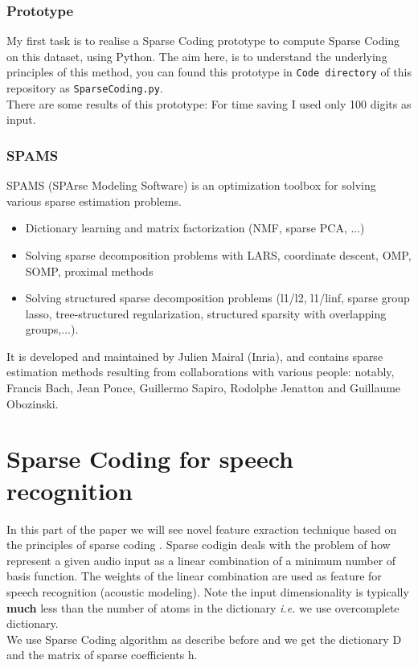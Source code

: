 \documentclass[a4paper,10pt]{article}
\begin{document}
\subsubsection{Prototype}
My first task is to realise a Sparse Coding prototype to compute Sparse Coding on this dataset, using Python. The aim here, is to understand the underlying principles of this method, you can found this prototype in \texttt{Code directory} of this repository as \texttt{SparseCoding.py}. \\
There are some results of this prototype: For time saving I used only 100 digits as input.

\subsubsection{SPAMS}
SPAMS (SPArse Modeling Software) is an optimization toolbox for solving various sparse estimation problems.
\begin{itemize}
 \item Dictionary learning and matrix factorization (NMF, sparse PCA, ...)
 \item Solving sparse decomposition problems with LARS, coordinate descent, OMP, SOMP, proximal methods
 \item Solving structured sparse decomposition problems (l1/l2, l1/linf, sparse group lasso, tree-structured regularization, structured sparsity with overlapping groups,...).
\end{itemize}
It is developed and maintained by Julien Mairal (Inria), and contains sparse estimation methods resulting from collaborations with various people: notably, Francis Bach, Jean Ponce, Guillermo Sapiro, Rodolphe Jenatton and Guillaume Obozinski.\\

\section{Sparse Coding for speech recognition}
In this part of the paper we will see novel feature exraction technique based on the principles of sparse coding \cite{DL_speech_reco}. Sparse codigin deals with the problem of how represent a given audio input as a linear combination of a minimum number of basis function. The weights of the linear combination are used as feature for speech recognition (acoustic modeling). Note the input dimensionality is typically \textbf{much} less than the number of atoms in the dictionary \textit{i.e.} we use overcomplete dictionary.\\
We use Sparse Coding algorithm as describe before and we get the dictionary D and  the matrix of sparse coefficients  h.\\
\end{document}
